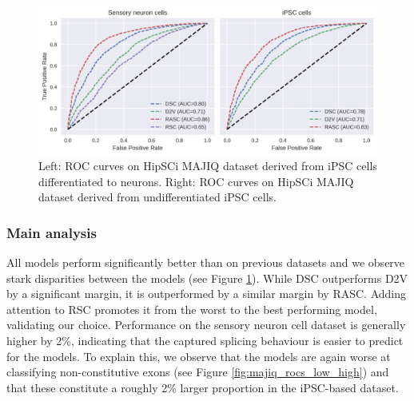 \begin{figure}
	\centering\includegraphics[width=1\textwidth]{../visualizations/ch5-results/majiq_neuron_ipsc_cross_model_roc_auc_comparison.png} 
	\caption{Left: ROC curves on HipSCi MAJIQ dataset derived from iPSC cells differentiated to neurons. Right: ROC curves on HipSCi MAJIQ dataset derived from undifferentiated iPSC cells. }
	\label{fig:majiq_rocs}
\end{figure}

\subsubsection{Main analysis}
All models perform significantly better than on previous datasets and we observe stark disparities between the models (see Figure \ref{fig:majiq_rocs}). While DSC outperforms D2V by a significant margin, it is outperformed by a similar margin by RASC. Adding attention to RSC promotes it from the worst to the best performing model, validating our choice. Performance on the sensory neuron cell dataset is generally higher by 2\%, indicating that the captured splicing behaviour is easier to predict for the models. To explain this, we observe that the models are again worse at classifying non-constitutive exons (see Figure \ref{fig:majiq_rocs_low_high}) and that these constitute a roughly 2\% larger proportion in the iPSC-based dataset. 





